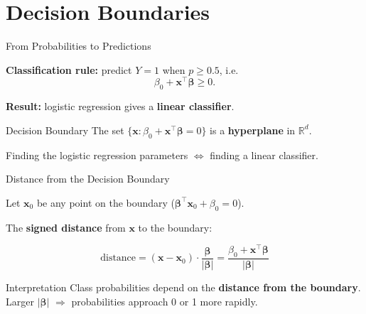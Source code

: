 \documentclass[aspectratio=169, professionalfonts]{beamer}
\def\R{\mathbb{R}}
\begin{document}
\section{Decision Boundaries}

\begin{frame}{From Probabilities to Predictions}

\textbf{Classification rule:} predict $Y=1$ when $p \ge 0.5$, i.e.\
$$\beta_0 + \mathbf{x}^\top\bm{\beta} \ge 0.$$

\bigskip

\textbf{Result:} logistic regression gives a \textbf{linear classifier}.

\bigskip

\begin{block}{Decision Boundary}
The set $\{\mathbf{x} : \beta_0 + \mathbf{x}^\top\bm{\beta} = 0\}$
is a \textbf{hyperplane} in $\R^d$.
\end{block}

Finding the logistic regression parameters $\Leftrightarrow$ finding a linear classifier.

\end{frame}

\begin{frame}{Distance from the Decision Boundary}

Let $\mathbf{x}_0$ be any point on the boundary ($\bm{\beta}^\top\mathbf{x}_0 + \beta_0 = 0$).

\bigskip

The \textbf{signed distance} from $\mathbf{x}$ to the boundary:

$$\text{distance}
  = (\mathbf{x}-\mathbf{x}_0)\cdot\frac{\bm{\beta}}{|\bm{\beta}|}
  = \frac{\beta_0 + \mathbf{x}^\top\bm{\beta}}{|\bm{\beta}|}$$

\bigskip

\begin{alertblock}{Interpretation}
Class probabilities depend on the \textbf{distance from the boundary}.
Larger $|\bm{\beta}|$ $\Rightarrow$ probabilities approach 0 or 1 more rapidly.
\end{alertblock}

\end{frame}

\end{document}
